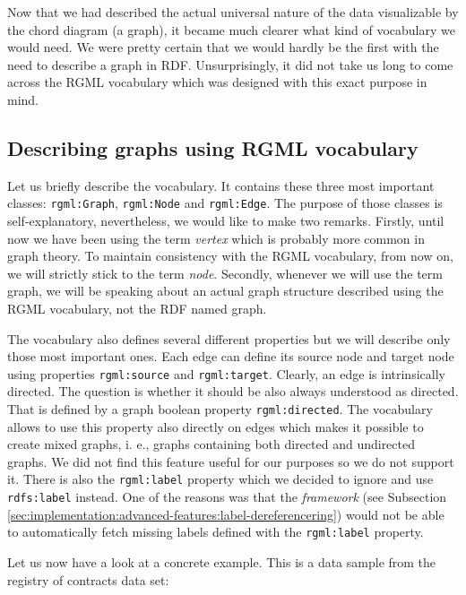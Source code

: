 Now that we had described the actual universal nature of the data visualizable by the chord diagram (a graph), it became much clearer what kind of vocabulary we would need. We were pretty certain that we would hardly be the first with the need to describe a graph in RDF. Unsurprisingly, it did not take us long to come across the RGML vocabulary which was designed with this exact purpose in mind.

\subsection{Describing graphs using RGML vocabulary}
\label{sec:visualizers:chord:rgml}

Let us briefly describe the vocabulary. It contains these three most important classes: \texttt{rgml:Graph}, \texttt{rgml:Node} and \texttt{rgml:Edge}. The purpose of those classes is self-explanatory, nevertheless, we would like to make two remarks. Firstly, until now we have been using the term \emph{vertex} which is probably more common in graph theory. To maintain consistency with the RGML vocabulary, from now on, we will strictly stick to the term \emph{node}. Secondly, whenever we will use the term graph, we will be speaking about an actual graph structure described using the RGML vocabulary, not the RDF named graph.

The vocabulary also defines several different properties but we will describe only those most important ones. Each edge can define its source node and target node using properties \texttt{rgml:source} and \texttt{rgml:target}. Clearly, an edge is intrinsically directed. The question is whether it should be also always understood as directed. That is defined by a graph boolean property \texttt{rgml:directed}. The vocabulary allows to use this property also directly on edges which makes it possible to create mixed graphs, i. e., graphs containing both directed and undirected graphs. We did not find this feature useful for our purposes so we do not support it. There is also the \texttt{rgml:label} property which we decided to ignore and use  \texttt{rdfs:label} instead. One of the reasons was that the \emph{framework} (see Subsection \ref{sec:implementation:advanced-features:label-dereferencering}) would not be able to automatically fetch missing labels defined with the \texttt{rgml:label} property.

Let us now have a look at a concrete example. This is a data sample from the registry of contracts data set:

